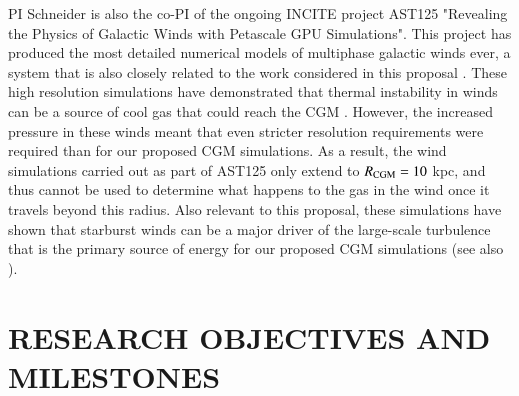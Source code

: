 \documentclass[11pt,letterpaper,english]{article}
\begin{document}
PI Schneider is also the co-PI of the ongoing INCITE project AST125 "Revealing the Physics of Galactic Winds with Petascale GPU Simulations". This project has produced the most detailed numerical models of multiphase galactic winds ever, a system that is also closely related to the work considered in this proposal \cite{Schneider18a}. These high resolution simulations have demonstrated that thermal instability in winds can be a source of cool gas that could reach the CGM \cite{Schneider18b}. However, the increased pressure in these winds meant that even stricter resolution requirements were required than for our proposed CGM simulations. As a result, the wind simulations carried out as part of AST125 only extend to $R_{\rm CGM} = 10$ kpc, and thus cannot be used to determine what happens to the gas in the wind once it travels beyond this radius. Also relevant to this proposal, these simulations have shown that starburst winds can be a major driver of the large-scale turbulence that is the primary source of energy for our proposed CGM simulations (see also \cite{Fielding17}).


\vspace{-.25in}
\section{RESEARCH OBJECTIVES AND MILESTONES }  
\vspace{-.2in}


\end{document}

